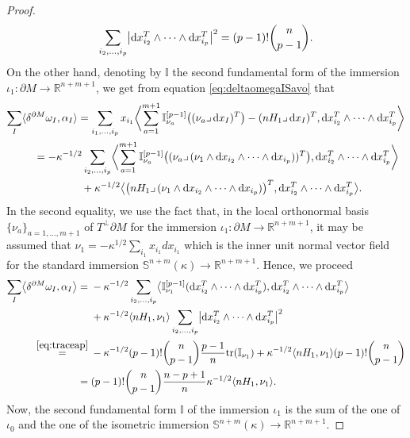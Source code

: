 \documentclass[pdftex]{sigma}
\numberwithin{equation}{section}
\begin{document}
\begin{proof}
\[\sum_{i_2,\dots,i_p}\bigl|{\rm d}x_{i_2}^T\wedge\dots\wedge {\rm d}x_{i_p}^T\bigr|^2=(p-1)!\binom{n}{p-1}.\]
On the other hand, denoting by $\mathbb{I}$ the second fundamental form of the immersion $\iota_1\colon\partial M\to \mathbb{R}^{n+m+1}$, we get from equation \eqref{eq:deltaomegaISavo} that
\begin{gather*}
\sum_I\langle \delta^{\partial M}\omega_I,\alpha_I\rangle = \sum_{i_1,\dots,i_p}x_{i_1}\biggl\langle\sum_{a=1}^{m+1}\mathbb{I}_{\nu_a}^{[p-1]}\bigl((\nu_a\lrcorner\,{\rm d}x_I)^T\bigr)-(nH_1\lrcorner\,{\rm d}x_I)^T,{\rm d}x_{i_2}^T\wedge\dots\wedge {\rm d}x_{i_p}^T\biggr\rangle\\
\qquad{} = -\kappa^{-1/2}\sum_{i_2,\dots,i_p}\biggl\langle\sum_{a=1}^{m+1}\mathbb{I}_{\nu_a}^{[p-1]}\bigl((\nu_a\lrcorner\,(\nu_1\wedge {\rm d}x_{i_2}\wedge\dots\wedge {\rm d}x_{i_p}))^T\bigr),{\rm d}x_{i_2}^T\wedge\dots\wedge {\rm d}x_{i_p}^T\biggr\rangle\\
\qquad\quad{} +\kappa^{-1/2}\bigl\langle\bigl(nH_1\lrcorner\,(\nu_1\wedge {\rm d}x_{i_2}\wedge\dots\wedge {\rm d}x_{i_p})\bigr)^T,{\rm d}x_{i_2}^T\wedge\dots\wedge {\rm d}x_{i_p}^T\bigr\rangle.
\end{gather*}
In the second equality, we use the fact that, in the local orthonormal basis $\{\nu_a\}_{a=1,\dots,m+1}$ of $T^\perp\partial M$ for the immersion $\iota_1\colon\partial M\to \mathbb{R}^{n+m+1}$, it may be assumed that $\nu_1=-\kappa^{1/2}\sum_{i_1}x_{i_1}dx_{i_1}$ which is the inner unit normal vector field for the standard immersion $\mathbb{S}^{n+m}(\kappa)\to\mathbb{R}^{n+m+1}$.
Hence, we proceed
\begin{align*}
\sum_I\bigl\langle \delta^{\partial M}\omega_I,\alpha_I\bigr\rangle ={}&-\kappa^{-1/2}\sum_{i_2,\dots,i_p}\bigl\langle\mathbb{I}_{\nu_1}^{[p-1]}({\rm d}x_{i_2}^T\wedge\dots\wedge {\rm d}x_{i_p}^T),{\rm d}x_{i_2}^T\wedge\dots\wedge {\rm d}x_{i_p}^T\bigr\rangle\\
&{} +\kappa^{-1/2}\langle nH_1,\nu_1\rangle\sum_{i_2,\dots,i_p} \bigl|{\rm d}x_{i_2}^T\wedge\dots\wedge {\rm d}x_{i_p}^T\bigr|^2\\
 \stackrel{\eqref{eq:traceap}}{=}{} &-\kappa^{-1/2}(p-1)!\binom{n}{p-1}\frac{p-1}{n}{\rm tr}(\mathbb{I}_{\nu_1})
+\kappa^{-1/2}\langle nH_1,\nu_1\rangle (p-1)!\binom{n}{p-1}\\
 ={} &(p-1)!\binom{n}{p-1}\frac{n-p+1}{n}\kappa^{-1/2}\langle nH_1,\nu_1\rangle.
\end{align*}
Now, the second fundamental form $\mathbb{I}$ of the immersion $\iota_1$ is the sum of the one of $\iota_0$ and the one of the isometric immersion $\mathbb{S}^{n+m}(\kappa)\to\mathbb{R}^{n+m+1}$.

\end{proof}
\end{document}
